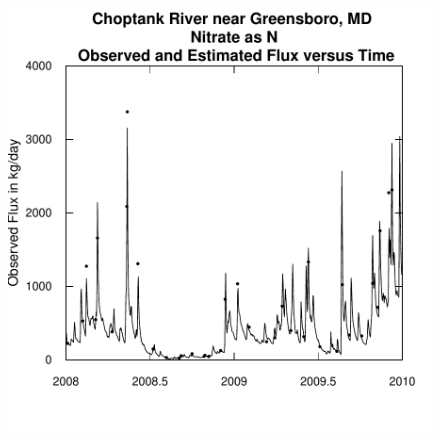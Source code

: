 \documentclass[a4paper,11pt]{article}
\begin{document}
\begin{figure}[htbp]
  \begin{minipage}[h]{0.5\linewidth}
    \begin{center}

\includegraphics{EGRET-figplotFluxTimeDaily}
    \label{fig:plotFluxTimeDaily}
    \end{center}
  \end{minipage}
  \hspace{0.5cm}
  \begin{minipage}[h]{0.5\linewidth}
    \begin{center}



\end{center}
\end{minipage}
\end{figure}
\end{document}
